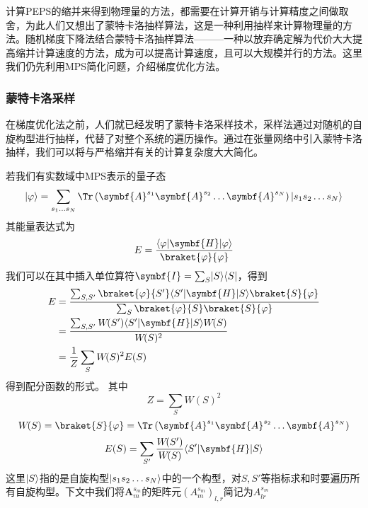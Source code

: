计算PEPS的缩并来得到物理量的方法，都需要在计算开销与计算精度之间做取舍，为此人们又想出了蒙特卡洛抽样算法，这是一种利用抽样来计算物理量的方法。随机梯度下降法结合蒙特卡洛抽样算法———一种以放弃确定解为代价大大提高缩并计算速度的方法，成为可以提高计算速度，且可以大规模并行的方法。这里我们仍先利用MPS简化问题，介绍梯度优化方法。

\subsubsection{蒙特卡洛采样}

在梯度优化法之前，人们就已经发明了蒙特卡洛采样技术，采样法通过对随机的自旋构型进行抽样，代替了对整个系统的遍历操作。通过在张量网络中引入蒙特卡洛抽样\cite{liuGradientOptimizationFinite2017,wangMonteCarloSimulation2011,sandvikVariationalQuantumMonte2007}，我们可以将与严格缩并有关的计算复杂度大大简化。


若我们有实数域中MPS表示的量子态
\begin{equation}\label{key}
\ket{\varphi} = \sum_{s_1\dots s_N}\Tr\left(\symbf{A}^{s_1}\symbf{A}^{s_2}\dots \symbf{A}^{s_N}\right)\ket{s_1 s_2\dots s_N}
\end{equation}
其能量表达式为
\begin{equation}\label{key}
E = \frac{\bra{\varphi}\symbf{H}\ket{\varphi}}{\braket{\varphi}{\varphi}}
\end{equation}
我们可以在其中插入单位算符$\symbf{I}=\sum_{S}\ket{S}\bra{S}$，得到
\begin{align*}
E &= \frac{\sum_{S,S'}\braket{\varphi}{S'}\bra{S'}\symbf{H}\ket{S}\braket{S}{\varphi}}{\sum_S\braket{\varphi}{S}\braket{S}{\varphi}}\\
	&= \frac{\sum_{S,S'}W\!(S')\bra{S'}\symbf{H}\ket{S}W\!(S)}{W\!(S)^2}\\
	&= \frac{1}{Z}\sum_S W\!(S)^2 E(S)
\end{align*}
得到配分函数的形式。
其中
\begin{equation}
Z = \sum_S W\!(S)^2
\end{equation}
\begin{equation}
W\!(S) = \braket{S}{\varphi} = \Tr\left(\symbf{A}^{s_1}\symbf{A}^{s_2}\dots \symbf{A}^{s_N}\right)
\end{equation}
\begin{equation}
E(S) = \sum_{S'}\frac{W\!(S')}{W\!(S)}\bra{S'}\symbf{H}\ket{S}
\end{equation}
这里$\lvert S\rangle$指的是自旋构型$\lvert s_1 s_2\dots s_N\rangle$中的一个构型，对$S,S'$等指标求和时要遍历所有自旋构型。下文中我们将$\symbf{A}^{s_m}_m$的矩阵元$(A^{s_m}_m)_{l,r}$简记为$A^{s_m}_{lr}$

